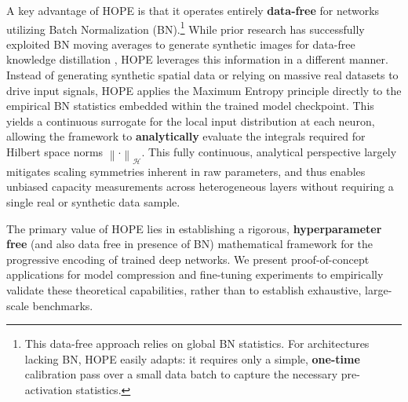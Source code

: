 \documentclass[11pt, a4paper, copyright, gdm]{google}
\newcommand{\norm}[1]{\left\lVert#1\right\rVert}
\newcommand{\calH}{\mathcal{H}}
\theoremstyle{definition}
\begin{document}
A key advantage of HOPE is that it operates entirely \textbf{data-free} for networks utilizing Batch Normalization (BN).\footnote{This data-free approach relies on global BN statistics. For architectures lacking BN, HOPE easily adapts: it requires only a simple, \textbf{one-time} calibration pass over a small data batch to capture the necessary pre-activation statistics.} While prior research has successfully exploited BN moving averages to generate synthetic images for data-free knowledge distillation \cite{yin2020dreaming, micaelli2019zero}, HOPE leverages this information in a different manner. Instead of generating synthetic spatial data or relying on massive real datasets to drive input signals, HOPE applies the Maximum Entropy principle directly to the empirical BN statistics embedded within the trained model checkpoint. This yields a continuous surrogate for the local input distribution at each neuron, allowing the framework to \textbf{analytically} evaluate the integrals required for Hilbert space norms $\norm{ \cdot}_{\calH}$. This fully continuous, analytical perspective largely mitigates scaling symmetries inherent in raw parameters, and thus enables unbiased capacity measurements across heterogeneous layers without requiring a single real or synthetic data sample.

The primary value of HOPE lies in establishing a rigorous, \textbf{hyperparameter free} (and also data free in presence of BN) mathematical framework for the progressive encoding of trained deep networks. We present proof-of-concept applications for model compression and fine-tuning experiments to empirically validate these theoretical capabilities, rather than to establish exhaustive, large-scale benchmarks.
\end{document}
